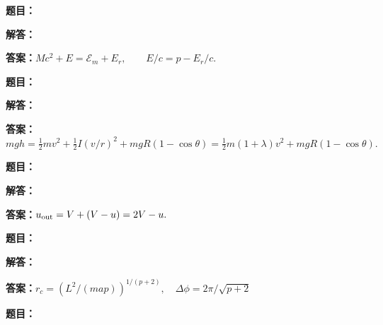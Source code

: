 \documentclass[lang=cn,color=blue,11pt]{elegantbook}
\begin{document}
\noindent\textbf{题目：}
\par\noindent\textbf{解答：}
\par\noindent\textbf{答案：}\(\displaystyle 
Mc^2+E=\mathcal E_m+E_r,\qquad
E/c=p-E_r/c.
\)\par
\par\smallskip\noindent\hrulefill\par\medskip
{}\par
\noindent\textbf{题目：}
\par\noindent\textbf{解答：}
\par\noindent\textbf{答案：}\(\displaystyle 
mgh=\frac12mv^2+\frac12I(v/r)^2+mgR(1-\cos\theta)
=\frac12m(1+\lambda)v^2+mgR(1-\cos\theta).
\)\par
\par\smallskip\noindent\hrulefill\par\medskip
{}\par
\noindent\textbf{题目：}
\par\noindent\textbf{解答：}
\par\noindent\textbf{答案：}\(\displaystyle 
u_{\rm out}=V+(V-u)=2V-u.
\)\par
\par\smallskip\noindent\hrulefill\par\medskip
{}\par
\noindent\textbf{题目：}
\par\noindent\textbf{解答：}
\par\noindent\textbf{答案：}\(\displaystyle r_c=(L^2/(map))^{1/(p+2)},\quad \Delta\phi=2\pi/\sqrt{p+2}\)\par
\par\smallskip\noindent\hrulefill\par\medskip
{}\par
\noindent\textbf{题目：}
\end{document}
